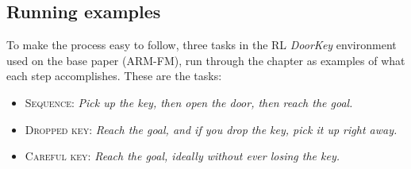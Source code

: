 \documentclass[11pt,english,listoffigures,listoftables]{tfgetsinf}
\newcommand{\runex}[1]{\textsc{#1}}  %
\newcommand{\env}[1]{\textsf{\slshape #1}}  %
\begin{document}

\subsection{Running examples}
\label{sec:running-examples}
To make the process easy to follow, three tasks in the RL \env{DoorKey} environment used on the base paper (ARM-FM), run through the chapter as examples of what each step accomplishes. These are the tasks:
\begin{itemize}
    \item \runex{Sequence}: \textit{Pick up the key, then open the door, then reach the goal.}
    \item \runex{Dropped key}: \textit{Reach the goal, and if you drop the key, pick it up right away.}
    \item \runex{Careful key}: \textit{Reach the goal, ideally without ever losing the key.}
\end{itemize}
\end{document}
